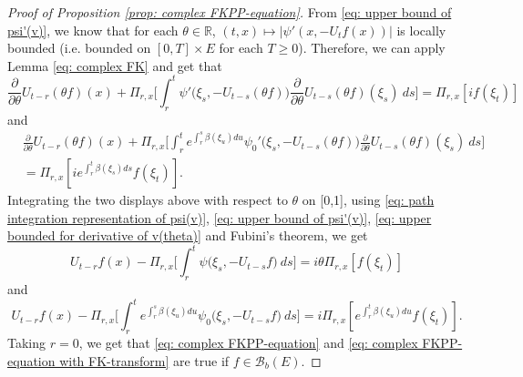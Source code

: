 \documentclass[UTF8]{pkuthss}
\theoremstyle{plain}
\theoremstyle{definition}
\numberwithin{equation}{section}
\begin{document}
\begin{proof}[Proof of Proposition \ref{prop: complex FKPP-equation}]
    From \eqref{eq: upper bound of psi'(v)}, we know that for each $\theta\in \mathbb R$, $(t,x) \mapsto |\psi'(x,-U_tf(x))|$ is locally bounded (i.e. bounded on $[0,T]\times E$ for each $T \geq 0$).
    Therefore, we can apply Lemma \ref{eq: complex FK} and get that
\[
    \frac{\partial}{\partial \theta} U_{t-r}(\theta f)(x) + \Pi_{r,x} \Big[\int_r^t \psi'\big(\xi_s,- U_{t-s}(\theta f)\big)\frac{\partial}{\partial \theta} U_{t-s}(\theta f)(\xi_s)~ds\Big]
    = \Pi_{r,x} [i f(\xi_t)]
\]
    and
\begin{align}
    &\frac{\partial}{\partial \theta} U_{t-r}(\theta f)(x) + \Pi_{r,x} \Big[\int_r^t e^{\int_r^s \beta(\xi_u)du}\psi_0'\big(\xi_s,- U_{t-s}(\theta f)\big)\frac{\partial}{\partial \theta} U_{t-s}(\theta f)(\xi_s)~ds\Big]\\
    &= \Pi_{r,x} [i e^{\int_r^t \beta(\xi_s)ds}f(\xi_t)].
\end{align}
    Integrating the two displays above with respect to $\theta$  on [0,1], using \eqref{eq: path integration representation of psi(v)}, \eqref{eq: upper bound of psi'(v)}, \eqref{eq: upper bounded for derivative of v(theta)} and Fubini's theorem, we get
\begin{equation}
    U_{t-r}f(x) - \Pi_{r,x} \Big[\int_r^t \psi\big(\xi_s,-U_{t-s}f\big) ~ds\Big]
    = i\theta \Pi_{r,x} [f(\xi_t)]
\end{equation}
    and
\begin{equation}
    U_{t-r}f(x) - \Pi_{r,x} \Big[\int_r^t e^{\int_r^s \beta(\xi_u)du} \psi_0\big(\xi_s,- U_{t-s}f\big) ~ds\Big]
    = i\Pi_{r,x} [e^{\int_r^t\beta(\xi_u)du}f(\xi_t)].
\end{equation}
    Taking $r = 0$, we get that \eqref{eq: complex FKPP-equation} and \eqref{eq: complex FKPP-equation with FK-transform} are true if $f\in \mathcal B_b(E)$.


\end{proof}
\end{document}
